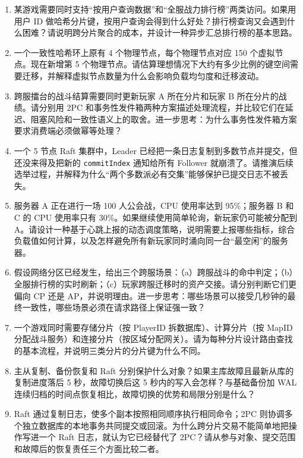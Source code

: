 \begin{tcolorbox}[breakable]
\begin{enumerate}
    \item 某游戏需要同时支持“按用户查询数据”和“全服战力排行榜”两类访问。如果用用户 ID 做哈希分片键，按用户查询会得到什么好处？排行榜查询又会遇到什么困难？请说明跨分片聚合的成本，并设计一种异步汇总排行榜的基本思路。

    \item 一个一致性哈希环上原有 4 个物理节点，每个物理节点对应 150 个虚拟节点。现在新增第 5 个物理节点。请估算理想情况下大约有多少比例的键空间需要迁移，并解释虚拟节点数量为什么会影响负载均匀度和迁移波动。

    \item 跨服擂台的战斗结算需要同时更新玩家 A 所在分片和玩家 B 所在分片的战绩。请分别用 2PC 和事务性发件箱两种方案描述处理流程，并比较它们在延迟、阻塞风险和一致性语义上的取舍。进一步思考：为什么事务性发件箱方案要求消费端必须做幂等处理？

    \item 一个 5 节点 Raft 集群中，Leader 已经把一条日志复制到多数节点并提交，但还没来得及把新的 \texttt{commitIndex} 通知给所有 Follower 就崩溃了。请推演后续选举过程，并解释为什么“两个多数派必有交集”能够保护已提交日志不被丢失。

    \item 服务器 A 正在进行一场 100 人公会战，CPU 使用率达到 95\%；服务器 B 和 C 的 CPU 使用率只有 30\%。如果继续使用简单轮询，新玩家仍可能被分配到 A。请设计一种基于心跳上报的动态调度策略，说明需要上报哪些指标，综合负载值如何计算，以及怎样避免所有新玩家同时涌向同一台“最空闲”的服务器。

    \item 假设网络分区已经发生，给出三个跨服场景：（a）跨服战斗的命中判定；（b）全服排行榜的实时刷新；（c）玩家跨服迁移时的资产交接。请分别判断它们更偏向 CP 还是 AP，并说明理由。进一步思考：哪些场景可以接受几秒钟的最终一致性，哪些场景必须在请求路径上保证强一致？

    \item 一个游戏同时需要存储分片（按 PlayerID 拆数据库）、计算分片（按 MapID 分配战斗服务）和连接分片（按区域分配网关）。请为每种分片设计路由查找的基本流程，并说明三类分片的分片键为什么不同。

    \item 主从复制、备份恢复和 Raft 分别保护什么对象？如果主库故障且最新从库的复制进度落后 5 秒，故障切换后这 5 秒内的写入会怎样？与基础备份加 WAL 连续归档的时间点恢复相比，故障切换的优势和局限分别是什么？

    \item Raft 通过复制日志，使多个副本按照相同顺序执行相同命令；2PC 则协调多个独立数据库的本地事务共同提交或回滚。为什么跨分片交易不能简单地把操作写进一个 Raft 日志，就认为它已经替代了 2PC？请从参与对象、提交范围和故障后的恢复责任三个方面比较二者。
\end{enumerate}
\end{tcolorbox}

\newpage
